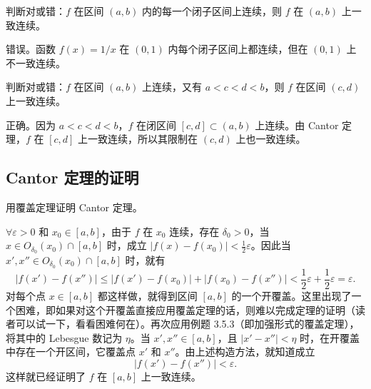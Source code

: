 \begin{xthought}[3]
判断对或错：$f$ 在区间 $(a,b)$ 内的每一个闭子区间上连续，则 $f$ 在 $(a,b)$ 上一致连续。
\end{xthought}
\begin{xsolution}
错误。函数 $f(x)=1/x$ 在 $(0,1)$ 内每个闭子区间上都连续，但在 $(0,1)$ 上不一致连续。
\end{xsolution}


\begin{xthought}[4]
判断对或错：$f$ 在区间 $(a,b)$ 上连续，又有 $a<c<d<b$，则 $f$ 在区间 $(c,d)$ 上一致连续。
\end{xthought}
\begin{xsolution}
正确。因为 $a<c<d<b$，$f$ 在闭区间 $[c,d]\subset(a,b)$ 上连续。由 Cantor 定理，$f$ 在 $[c,d]$ 上一致连续，所以其限制在 $(c,d)$ 上也一致连续。
\end{xsolution}


\subsection{Cantor 定理的证明}

\begin{xexample}[5.4.1]
用覆盖定理证明 Cantor 定理。
\end{xexample}
\begin{xproof}
$\forall\varepsilon>0$ 和 $x_0\in[a,b]$，由于 $f$ 在 $x_0$ 连续，存在 $\delta_0>0$，当 $x\in O_{\delta_0}(x_0)\cap[a,b]$ 时，成立 $|f(x)-f(x_0)|<\frac12\varepsilon$。因此当 $x',x''\in O_{\delta_0}(x_0)\cap[a,b]$ 时，就有
\[
  |f(x')-f(x'')|\le|f(x')-f(x_0)|+|f(x_0)-f(x'')|<\frac12\varepsilon+\frac12\varepsilon=\varepsilon.
\]
对每个点 $x\in[a,b]$ 都这样做，就得到区间 $[a,b]$ 的一个开覆盖。这里出现了一个困难，即如果对这个开覆盖直接应用覆盖定理的话，则难以完成定理的证明（读者可以试一下，看看困难何在）。再次应用例题 3.5.3（即加强形式的覆盖定理），将其中的 Lebesgue 数记为 $\eta$。当 $x',x''\in[a,b]$，且 $|x'-x''|<\eta$ 时，在开覆盖中存在一个开区间，它覆盖点 $x'$ 和 $x''$。由上述构造方法，就知道成立
\[
  |f(x')-f(x'')|<\varepsilon.
\]
这样就已经证明了 $f$ 在 $[a,b]$ 上一致连续。
\end{xproof}

